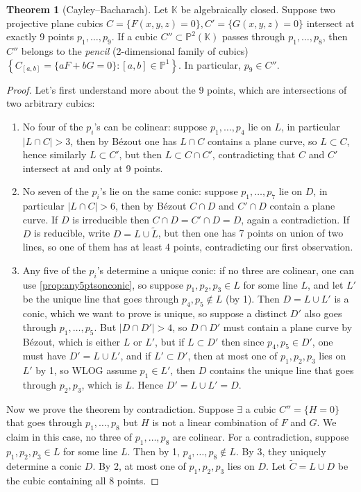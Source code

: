 \documentclass{article}
\newcommand{\K}{\mathbb{K}}
\newcommand{\p}{\mathbb{P}}
\theoremstyle{definition}
\newtheorem{thm}[defn]{Theorem}
\begin{document}
\begin{thm}[Cayley--Bacharach]
Let $\K$ be algebraically closed. Suppose two projective plane cubics $C=\{F(x,y,z)=0\},C'=\{G(x,y,z)=0\}$ intersect at exactly 9 points $p_1,\ldots,p_9$. If a cubic $C''\subset\p^2(\K)$ passes through $p_1,\ldots,p_8$, then $C''$ belongs to the \textit{pencil} (2-dimensional family of cubics) $\left\{C_{[a,b]}=\{aF+bG=0\}:[a,b]\in\p^1\right\}$. In particular, $p_9\in C''$.
\end{thm}
\begin{proof}
Let's first understand more about the 9 points, which are intersections of two arbitrary cubics:
\begin{enumerate}
\item No four of the $p_i$'s can be colinear: suppose $p_1,\ldots,p_4$ lie on $L$, in particular $|L\cap C|>3$, then by Bézout one has $L\cap C$ contains a plane curve, so $L\subset C$, hence similarly $L\subset C'$, but then $L\subset C\cap C'$, contradicting that $C$ and $C'$ intersect at and only at 9 points.
\item No seven of the $p_i$'s lie on the same conic: suppose $p_1,\ldots,p_7$ lie on $D$, in particular $|L\cap C|>6$, then by Bézout $C\cap D$ and $C'\cap D$ contain a plane curve. If $D$ is irreducible then $C\cap D=C'\cap D=D$, again a contradiction. If $D$ is reducible, write $D=L\cup\widetilde L$, but then one has 7 points on union of two lines, so one of them has at least 4 points, contradicting our first observation.
\item Any five of the $p_i$'s determine a unique conic: if no three are colinear, one can use \ref{prop:any5ptsonconic}, so suppose $p_1,p_2,p_3\in L$ for some line $L$, and let $L'$ be the unique line that goes through $p_4,p_5\notin L$ (by 1). Then $D=L\cup L'$ is a conic, which we want to prove is unique, so suppose a distinct $D'$ also goes through $p_1,\ldots,p_5$. But $|D\cap D'|>4$, so $D\cap D'$ must contain a plane curve by Bézout, which is either $L$ or $L'$, but if $L\subset D'$ then since $p_4,p_5\in D'$, one must have $D'=L\cup L'$, and if $L'\subset D'$, then at most one of $p_1,p_2,p_3$ lies on $L'$ by 1, so WLOG assume $p_1\in L'$, then $D$ contains the unique line that goes through $p_2,p_3$, which is $L$. Hence $D'=L\cup L'=D$.
\end{enumerate}
Now we prove the theorem by contradiction. Suppose $\exists$ a cubic $C''=\{H=0\}$ that goes through $p_1,\ldots,p_8$ but $H$ is not a linear combination of $F$ and $G$. We claim in this case, no three of $p_1,\ldots,p_8$ are colinear. For a contradiction, suppose $p_1,p_2,p_3\in L$ for some line $L$. Then by 1, $p_4,\ldots,p_8\notin L$. By 3, they uniquely determine a conic $D$. By 2, at most one of $p_1,p_2,p_3$ lies on $D$. Let $\widetilde C=L\cup D$ be the cubic containing all 8 points.


\end{proof}
\end{document}
